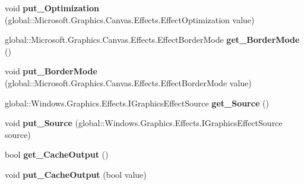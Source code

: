 \begin{DoxyCompactItemize}
void {\bfseries put\+\_\+\+Optimization} (global\+::\+Microsoft.\+Graphics.\+Canvas.\+Effects.\+Effect\+Optimization value)
\item 
\mbox{\label{class_microsoft_1_1_graphics_1_1_canvas_1_1_effects_1_1_gaussian_blur_effect_a1fe5f86a30992bc3bf2477a872efde7a}} 
global\+::\+Microsoft.\+Graphics.\+Canvas.\+Effects.\+Effect\+Border\+Mode {\bfseries get\+\_\+\+Border\+Mode} ()
\item 
\mbox{\label{class_microsoft_1_1_graphics_1_1_canvas_1_1_effects_1_1_gaussian_blur_effect_af4c57d16f0f76baf8d713b866be1aa8e}} 
void {\bfseries put\+\_\+\+Border\+Mode} (global\+::\+Microsoft.\+Graphics.\+Canvas.\+Effects.\+Effect\+Border\+Mode value)
\item 
\mbox{\label{class_microsoft_1_1_graphics_1_1_canvas_1_1_effects_1_1_gaussian_blur_effect_af0d443d7aeeb6d8541a6d4b8d0a7d372}} 
global\+::\+Windows.\+Graphics.\+Effects.\+I\+Graphics\+Effect\+Source {\bfseries get\+\_\+\+Source} ()
\item 
\mbox{\label{class_microsoft_1_1_graphics_1_1_canvas_1_1_effects_1_1_gaussian_blur_effect_add0eb1e5c62d97e901bb02b01de846c2}} 
void {\bfseries put\+\_\+\+Source} (global\+::\+Windows.\+Graphics.\+Effects.\+I\+Graphics\+Effect\+Source source)
\item 
\mbox{\label{class_microsoft_1_1_graphics_1_1_canvas_1_1_effects_1_1_gaussian_blur_effect_a047fc3cd1ad5bc5aaaeff65c2dab8c8d}} 
bool {\bfseries get\+\_\+\+Cache\+Output} ()
\item 
\mbox{\label{class_microsoft_1_1_graphics_1_1_canvas_1_1_effects_1_1_gaussian_blur_effect_a896e2e8ccc6286112070e770e35269d8}} 
void {\bfseries put\+\_\+\+Cache\+Output} (bool value)
\item 
\mbox{\label{class_microsoft_1_1_graphics_1_1_canvas_1_1_effects_1_1_gaussian_blur_effect_a5aaa8d9c48f4d44cf33eb0d5cb7dd589}} 

\end{DoxyCompactItemize}
